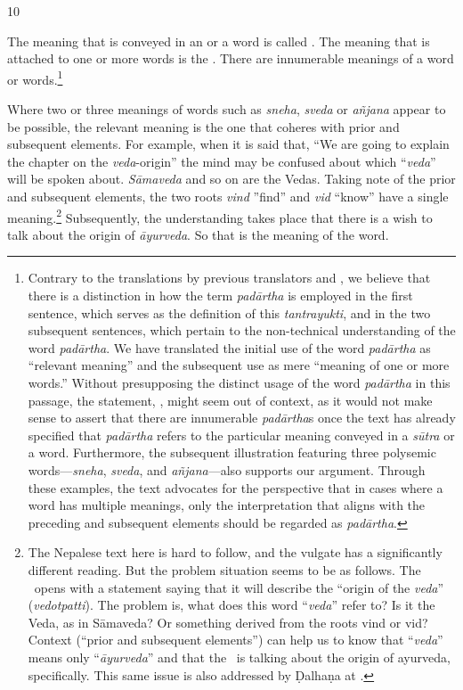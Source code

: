 \begin{translation}
\item [10]\label{padartha} 

The meaning that is conveyed in an  or a word is 
called . The meaning that is attached to 
one or more words is the . 
There are innumerable meanings of a word or words.\footnote{\label{fn.contrary}Contrary to the translations by previous translators 
	\citeauthor{sing-1980} and \citeauthor{shar-1999}, we believe that there is a distinction in how the term \emph{padārtha} is employed in the first sentence, which serves as the definition of this \emph{tantrayukti}, and in the two subsequent sentences, which pertain to the non-technical understanding of the word \emph{padārtha}. We have translated the initial use of the word \emph{padārtha} as “relevant meaning” and the subsequent use as mere “meaning of one or more words.” Without presupposing the distinct usage of the word \emph{padārtha} in this passage, the statement, , might seem out of context, as it would not make sense to assert that there are innumerable \emph{padārtha}s once the text has already specified that \emph{padārtha} refers to the particular meaning conveyed in a \emph{sūtra} or a word. Furthermore, the subsequent illustration featuring three polysemic words---\emph{sneha}, \emph{sveda}, and \emph{añjana}---also supports our argument. Through these examples, the text advocates for the perspective that in cases where a word has multiple meanings, only the interpretation that aligns with the preceding and subsequent elements should be regarded as \emph{padārtha}.} 

Where two or three meanings of words such as \emph{sneha}, \emph{sveda} or \emph{añjana} appear
to be possible, the relevant meaning is the one that coheres with prior
and subsequent elements.
For example, when it is said that, 
“We are going to explain the chapter on the \emph{veda}-origin” the mind may be confused about which “\emph{veda}” will be spoken about. \emph{Sāmaveda} and so on are the Vedas.
Taking note of the prior and subsequent elements, the two roots \emph{vind} ”find” and \emph{vid} “know”
have a single meaning.\footnote{The Nepalese
    	text here is hard to follow, and the vulgate has a significantly
    	different reading. But the problem situation seems to be as follows.  The
    	\SS\ opens with a statement saying that it will describe the “origin of
    	the \emph{veda}” (\emph{vedotpatti}).  The problem is, what does this
    	word “\emph{veda}” refer to?  Is it the Veda, as in Sāmaveda?  Or
    	something derived from the roots \root vind or \root vid?  Context
    	(“prior and subsequent elements”) can help us to know that “\emph{veda}”
    	means only “\emph{āyurveda}” and that the \SS\ is talking about the
    	origin of ayurveda, specifically.  This same issue is also addressed by 
    	Ḍalhaṇa at .} 
Subsequently, the understanding takes place that there is a wish to talk about the origin of \emph{āyurveda}.  So that is the meaning of the word.


\end{translation}
